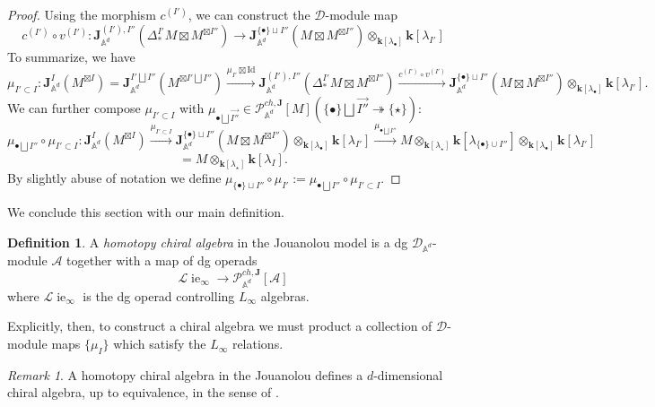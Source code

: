 \documentclass[11pt]{amsart}
\theoremstyle{definition}
\newtheorem{defn}[thm]{Definition}
\theoremstyle{remark}
\newtheorem{rem}[thm]{Remark}
\numberwithin{equation}{section}
\newcommand{\op}{\operatorname}
\newcommand{\kk}{\mathbf{k}}
\begin{document}
\begin{proof}
Using the morphism $c^{(I')}$, we can construct the $\mathcal{D}$-module map
$$
c^{(I')}\circ v^{(I')}:\mathbf{J}^{({I'}),{{I''}}}_{\mathbb{A}^d}(\Delta^{I'}_*M\boxtimes M^{\boxtimes{I''}})\rightarrow \mathbf{J}^{\{\bullet\}\sqcup{{I''}}}_{\mathbb{A}^d}(M\boxtimes M^{\boxtimes{I''}})\otimes_{\kk[\lambda_{\bullet}]}\kk[\lambda_{I'}]
$$
To summarize, we have
$$
\mu_{{I'}\subset {I}}:\mathbf{J}^{{I}}_{\mathbb{A}^d}(M^{\boxtimes{I}})=\mathbf{J}^{{I'}\bigsqcup {I''}}_{\mathbb{A}^d}(M^{\boxtimes{I'}\bigsqcup {I''}})\xrightarrow{\mu_{{I'}}\boxtimes \mathrm{Id}} \mathbf{J}^{({I'}),{{I''}}}_{\mathbb{A}^d}(\Delta^{I'}_*M\boxtimes M^{\boxtimes{I''}})\xrightarrow{c^{(I')}\circ v^{(I')}} \mathbf{J}^{\{\bullet\}\sqcup{{I''}}}_{\mathbb{A}^d}(M\boxtimes M^{\boxtimes{I''}})\otimes_{\kk[\lambda_{\bullet}]}\kk[\lambda_{I'}].
$$
We can further compose $\mu_{ I'\subset  I}$ with $\mu_{\bullet \bigsqcup \vec{I''}}\in \mathcal{P}^{ch,\mathbf{J}}_{\mathbb{A}^d}[M](\{\bullet \}\bigsqcup \vec{I''}\twoheadrightarrow \{\star\})$:
\[
\mu_{\bullet \bigsqcup {I''}}\circ\mu_{{I'}\subset {I}}:\mathbf{J}^{{I}}_{\mathbb{A}^d}(M^{\boxtimes{I}})\xrightarrow{\mu_{{I'}\subset {I}}}  \mathbf{J}^{\{\bullet\}\sqcup{{I''}}}_{\mathbb{A}^d}(M\boxtimes M^{\boxtimes{I''}})\otimes_{\kk[\lambda_{\bullet}]}\kk[\lambda_{I'}]\xrightarrow{\mu_{\bullet \bigsqcup {I''}}}M\otimes_{\mathbf{k}[\lambda_{\star}]}\mathbf{k}[\lambda_{\{\bullet\}\cup I''}]\otimes_{\mathbf{k}[\lambda_{\bullet}]}\mathbf{k}[\lambda_{I'}]
\]
\[
=M\otimes_{\mathbf{k}[\lambda_{\star}]}\mathbf{k}[\lambda_{I}].
\]
By slightly abuse of notation we define $\mu_{\{\bullet\}\sqcup I''}\circ \mu_{ I'}:=\mu_{\bullet \bigsqcup {I''}}\circ\mu_{{I'}\subset {I}}$. 
\end{proof}

We conclude this section with our main definition.

\begin{defn}
  A \textit{homotopy chiral algebra} in the Jouanolou model is a dg $\mathcal{D}_{\mathbb{A}^d}$-module $\mathcal{A}$
  together with a map of dg operads
  \[
\mathcal{L}\!\op{ie}_{\infty}\rightarrow \mathcal{P}^{ch,\mathbf{J}}_{\mathbb{A}^d}[\mathcal{A}]
\]
where $\mathcal{L}\!\op{ie}_{\infty}$ is the dg operad controlling $L_\infty$ algebras.
\end{defn}

Explicitly, then, to construct a chiral algebra we must product a collection of $\mathcal{D}$-module maps $\{\mu_I\}$
which satisfy the $L_\infty$ relations.

\begin{rem}
  A homotopy chiral algebra in the Jouanolou defines a $d$-dimensional chiral algebra, up to equivalence, in the sense of
  \cite{FG}.
\end{rem}
\end{document}
